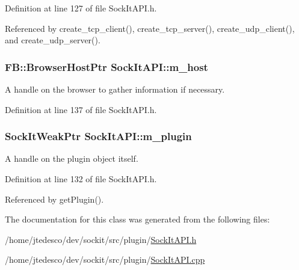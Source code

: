 Definition at line 127 of file SockItAPI.h.



Referenced by create\_\-tcp\_\-client(), create\_\-tcp\_\-server(), create\_\-udp\_\-client(), and create\_\-udp\_\-server().

\hypertarget{classSockItAPI_afb9c76de5331308b066e969d9a35d236}{
\subsubsection[{m\_\-host}]{\setlength{\rightskip}{0pt plus 5cm}FB::BrowserHostPtr {\bf SockItAPI::m\_\-host}}}
\label{classSockItAPI_afb9c76de5331308b066e969d9a35d236}
A handle on the browser to gather information if necessary. 

Definition at line 137 of file SockItAPI.h.

\hypertarget{classSockItAPI_ac973fa980fa71d06190969448621beea}{
\subsubsection[{m\_\-plugin}]{\setlength{\rightskip}{0pt plus 5cm}SockItWeakPtr {\bf SockItAPI::m\_\-plugin}}}
\label{classSockItAPI_ac973fa980fa71d06190969448621beea}
A handle on the plugin object itself. 

Definition at line 132 of file SockItAPI.h.



Referenced by getPlugin().



The documentation for this class was generated from the following files:\begin{DoxyCompactItemize}
\item 
/home/jtedesco/dev/sockit/src/plugin/\hyperlink{SockItAPI_8h}{SockItAPI.h}\item 
/home/jtedesco/dev/sockit/src/plugin/\hyperlink{SockItAPI_8cpp}{SockItAPI.cpp}\end{DoxyCompactItemize}

